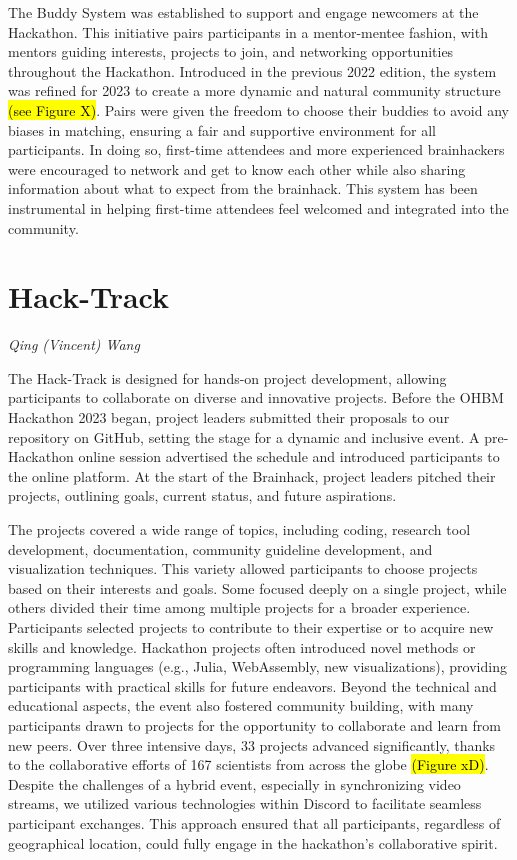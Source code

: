 \documentclass{article}
\newcommand\coordinator[1]{\begin{flushleft}\small\textit{#1}\end{flushleft}}
\begin{document}
The Buddy System was established to support and engage newcomers at the Hackathon.
This initiative pairs participants in a mentor-mentee fashion, with mentors guiding interests, projects to join, and networking opportunities throughout the Hackathon.
Introduced in the previous 2022 edition, the system was refined for 2023 to create a more dynamic and natural community structure \hl{(see Figure X)}.
Pairs were given the freedom to choose their buddies to avoid any biases in matching, ensuring a fair and supportive environment for all participants.
In doing so, first-time attendees and more experienced brainhackers were encouraged to network and get to know each other while also sharing information about what to expect from the brainhack.
This system has been instrumental in helping first-time attendees feel welcomed and integrated into the community.

\section{Hack-Track}
\coordinator{Qing (Vincent) Wang}

The Hack-Track is designed for hands-on project development, allowing participants to collaborate on diverse and innovative projects.
Before the OHBM Hackathon 2023 began, project leaders submitted their proposals to our repository on GitHub, setting the stage for a dynamic and inclusive event.
A pre-Hackathon online session advertised the schedule and introduced participants to the online platform.
At the start of the Brainhack, project leaders pitched their projects, outlining goals, current status, and future aspirations.

The projects covered a wide range of topics, including coding, research tool development, documentation, community guideline development, and visualization techniques.
This variety allowed participants to choose projects based on their interests and goals.
Some focused deeply on a single project, while others divided their time among multiple projects for a broader experience.
Participants selected projects to contribute to their expertise or to acquire new skills and knowledge.
Hackathon projects often introduced novel methods or programming languages (e.g., Julia, WebAssembly, new visualizations), providing participants with practical skills for future endeavors.
Beyond the technical and educational aspects, the event also fostered community building, with many participants drawn to projects for the opportunity to collaborate and learn from new peers.
Over three intensive days, 33 projects advanced significantly, thanks to the collaborative efforts of 167 scientists from across the globe \hl{(Figure xD)}.
Despite the challenges of a hybrid event, especially in synchronizing video streams, we utilized various technologies within Discord to facilitate seamless participant exchanges.
This approach ensured that all participants, regardless of geographical location, could fully engage in the hackathon's collaborative spirit.
\end{document}
